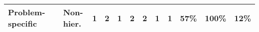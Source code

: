 \begin{tabular}{lllcccccccccc}
Problem-specific  &  & Non-hier.   & {\cellcolor[HTML]{00441B}} \color[HTML]{F1F1F1} 1 & {\cellcolor[HTML]{F7FCF5}} \color[HTML]{000000} 2 & {\cellcolor[HTML]{00441B}} \color[HTML]{F1F1F1} 1 & {\cellcolor[HTML]{F7FCF5}} \color[HTML]{000000} 2 & {\cellcolor[HTML]{F7FCF5}} \color[HTML]{000000} 2 & {\cellcolor[HTML]{00441B}} \color[HTML]{F1F1F1} 1 & {\cellcolor[HTML]{00441B}} \color[HTML]{F1F1F1} 1 & {\cellcolor[HTML]{539ECD}} \color[HTML]{F1F1F1} 57\% & {\cellcolor[HTML]{08306B}} \color[HTML]{F1F1F1} 100\% & {\cellcolor[HTML]{94D390}} \color[HTML]{000000} 12\% \\
\bottomrule
\end{tabular}

